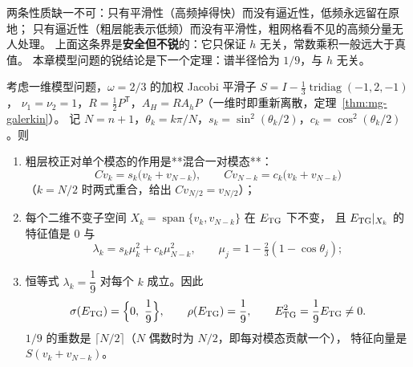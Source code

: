 \begin{remark}
两条性质缺一不可：只有平滑性（高频掉得快）而没有逼近性，低频永远留在原地；
只有逼近性（粗层能表示低频）而没有平滑性，粗网格看不见的高频分量无人处理。
上面这条界是\textbf{安全但不锐}的：它只保证 $h$ 无关，常数乘积一般远大于真值。
本章模型问题的锐结论是下一个定理：谱半径恰为 $1/9$，与 $h$ 无关。
\end{remark}

\begin{theorem}[两网格算子的精确谱：$\sigma(E_{\rm TG})=\{0,\frac19\}$]
\label{thm:mg-tg-spectrum}
考虑一维模型问题，$\omega=2/3$ 的加权 Jacobi 平滑子 $S=I-\frac13\operatorname{tridiag}(-1,2,-1)$，
$\nu_1=\nu_2=1$，$R=\frac12P^{\mathsf T}$，$A_H=RA_hP$（一维时即重新离散，定理~\ref{thm:mg-galerkin}）。
记 $N=n+1$，$\theta_k=k\pi/N$，$s_k=\sin^2(\theta_k/2)$，$c_k=\cos^2(\theta_k/2)$。则
\begin{enumerate}
  \item 粗层校正对单个模态的作用是**混合一对模态**：
        \begin{equation}
          Cv_k=s_k\bigl(v_k+v_{N-k}\bigr),\qquad
          Cv_{N-k}=c_k\bigl(v_k+v_{N-k}\bigr)
          \label{eq:mg-C-pair}
        \end{equation}
        （$k=N/2$ 时两式重合，给出 $Cv_{N/2}=v_{N/2}$）；
  \item 每个二维不变子空间 $X_k=\operatorname{span}\{v_k,v_{N-k}\}$ 在 $E_{\rm TG}$ 下不变，
        且 $E_{\rm TG}|_{X_k}$ 的特征值是 $0$ 与
        \begin{equation}
          \lambda_k=s_k\mu_k^2+c_k\mu_{N-k}^2,
          \qquad \mu_j=1-\tfrac23(1-\cos\theta_j);
          \label{eq:mg-lambda-k}
        \end{equation}
  \item 恒等式 $\lambda_k=\dfrac19$ 对每个 $k$ 成立。因此
        \begin{equation}
          \sigma(E_{\rm TG})=\Bigl\{0,\ \frac19\Bigr\},
          \qquad
          \rho(E_{\rm TG})=\frac19,
          \qquad
          E_{\rm TG}^2=\frac19E_{\rm TG}\ne0 .
          \label{eq:mg-rho-tg}
        \end{equation}
        $1/9$ 的重数是 $\lceil N/2\rceil$（$N$ 偶数时为 $N/2$，即每对模态贡献一个），
        特征向量是 $S(v_k+v_{N-k})$。
\end{enumerate}
\end{theorem}

